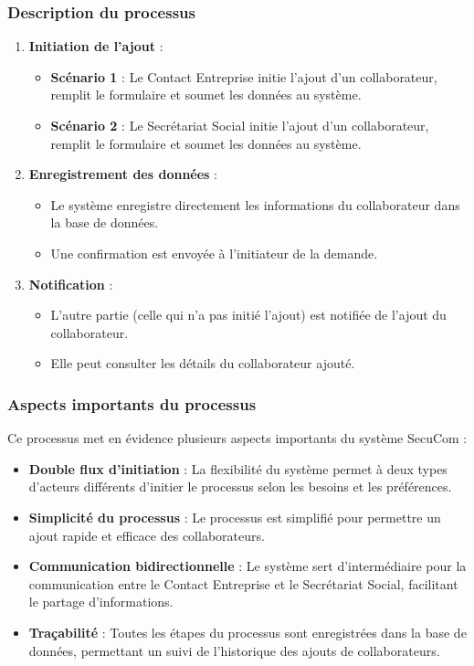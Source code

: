 \documentclass[12pt,a4paper]{report}
\begin{document}
\subsubsection{Description du processus}

\begin{enumerate}
  \item \textbf{Initiation de l'ajout} :
    \begin{itemize}
      \item \textbf{Scénario 1} : Le Contact Entreprise initie l'ajout d'un collaborateur, remplit le formulaire et soumet les données au système.
      \item \textbf{Scénario 2} : Le Secrétariat Social initie l'ajout d'un collaborateur, remplit le formulaire et soumet les données au système.
    \end{itemize}

  \item \textbf{Enregistrement des données} :
    \begin{itemize}
      \item Le système enregistre directement les informations du collaborateur dans la base de données.
      \item Une confirmation est envoyée à l'initiateur de la demande.
    \end{itemize}

  \item \textbf{Notification} :
    \begin{itemize}
      \item L'autre partie (celle qui n'a pas initié l'ajout) est notifiée de l'ajout du collaborateur.
      \item Elle peut consulter les détails du collaborateur ajouté.
    \end{itemize}
\end{enumerate}

\subsubsection{Aspects importants du processus}

Ce processus met en évidence plusieurs aspects importants du système SecuCom :

\begin{itemize}
  \item \textbf{Double flux d'initiation} : La flexibilité du système permet à deux types d'acteurs différents d'initier le processus selon les besoins et les préférences.
  \item \textbf{Simplicité du processus} : Le processus est simplifié pour permettre un ajout rapide et efficace des collaborateurs.
  \item \textbf{Communication bidirectionnelle} : Le système sert d'intermédiaire pour la communication entre le Contact Entreprise et le Secrétariat Social, facilitant le partage d'informations.
  \item \textbf{Traçabilité} : Toutes les étapes du processus sont enregistrées dans la base de données, permettant un suivi de l'historique des ajouts de collaborateurs.
\end{itemize}
\end{document}
